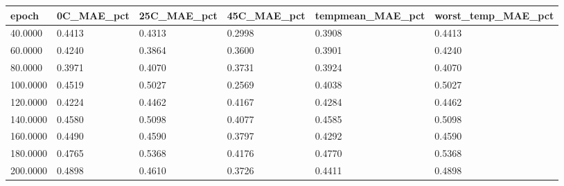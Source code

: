 \begin{tabular}{llllll}
\hline
epoch & 0C_MAE_pct & 25C_MAE_pct & 45C_MAE_pct & tempmean_MAE_pct & worst_temp_MAE_pct \\
\hline
40.0000 & 0.4413 & 0.4313 & 0.2998 & 0.3908 & 0.4413 \\
60.0000 & 0.4240 & 0.3864 & 0.3600 & 0.3901 & 0.4240 \\
80.0000 & 0.3971 & 0.4070 & 0.3731 & 0.3924 & 0.4070 \\
100.0000 & 0.4519 & 0.5027 & 0.2569 & 0.4038 & 0.5027 \\
120.0000 & 0.4224 & 0.4462 & 0.4167 & 0.4284 & 0.4462 \\
140.0000 & 0.4580 & 0.5098 & 0.4077 & 0.4585 & 0.5098 \\
160.0000 & 0.4490 & 0.4590 & 0.3797 & 0.4292 & 0.4590 \\
180.0000 & 0.4765 & 0.5368 & 0.4176 & 0.4770 & 0.5368 \\
200.0000 & 0.4898 & 0.4610 & 0.3726 & 0.4411 & 0.4898 \\
\hline
\end{tabular}
